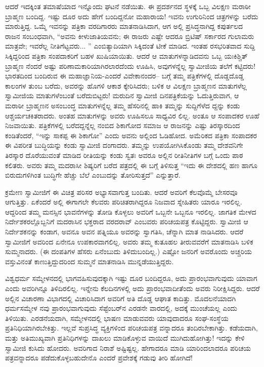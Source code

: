 ಆದರೆ ಇದಕ್ಕಿಂತ ತಮಾಷೆಯಾದ ಇನ್ನೊಂದು ಘಟನೆ ನಡೆಯಿತು. ಈ ಪ್ರದರ್ಶನದ ಸ್ಥಳಕ್ಕೆ ಒಬ್ಬ ವಿಲಕ್ಷಣ ಮರಾಠೀ ಬ್ರಾಹ್ಮಣ ಬಂದಿದ್ದ. ಇಷ್ಟು ದೂರ ಅದು ಹೇಗೆ ಬಂದಿದ್ದನೋ ಮಹಾರಾಯ! ಇವನು ಉಗುರಿನಿಂದ ಚಿತ್ರಗಳನ್ನು ಬರೆದು ಮಾರುತ್ತಿದ್ದ. ಒಮ್ಮೆ ಇವನನ್ನು ಪತ್ರಿಕಾ ವರದಿಗಾರರು ಮಾತನಾಡಿಸಿದಾಗ, ಆಗ ಅಲ್ಲಿ ಪ್ರಸಿದ್ಧನಾಗಿದ್ದ ಕಪುರ್ತಲದ ರಾಜನ ಸಂಬಂಧವಾಗಿ, “ಅವನು ಕೀಳುಜಾತಿಯವನು; ಈ ರಾಜರು ಎಷ್ಟೇ ಆದರೂ ಬ್ರಿಟಿಷ್ ಸರ್ಕಾರದ ಗುಲಾಮರು ಮಾತ್ರವೇ; ಇವರೆಲ್ಲ ನೀತಿಗೆಟ್ಟವರು... ” ಎಂಬಿತ್ಯಾದಿಯಾಗಿ ಸಿಕ್ಕಿದಂತೆ ಟೀಕೆ ಮಾಡಿದ. ಇಂತಹ ರಸಭರಿತವಾದ ಸುದ್ದಿ ಸಿಕ್ಕಿದ್ದರಿಂದ ಪತ್ರಿಕಾ ಸಂಪದಾಕರಿಗೆ ಬಹಳ ಖುಷಿಯಾಯಿತು. ಆದರೆ ಆ ಮಾತುಗಳನ್ನಾಡಿದವನು ಒಬ್ಬ ಯಃಕಿಶ್ಚಿತ್ ಬ್ರಾಹ್ಮಣ ನೆಂದರೆ ಅಷ್ಟು ಪರಿಣಾಮಕಾರಿಯಾಗಿರಲಾರದೆಂದು ಊಹಿಸಿ, ಅವುಗಳನ್ನೆಲ್ಲ ಸ್ವಾಮೀಜಿಯ ತಲೆಗೆ ಕಟ್ಟಿದರು! ಭಾರತದಿಂದ ಬಂದಿರುವ ಈ ಮಹಾಜ್ಞಾನಿಯ-ಎಂದರೆ ವಿವೇಕಾನಂದರ– ಬಗ್ಗೆ ತಮ್ಮ ಪತ್ರಿಕೆಗಳಲ್ಲಿ ದೊಡ್ಡದೊಡ್ಡ ಕಾಲಂಗಳ ತುಂಬ ಬರೆದು, ಅವರನ್ನು ಹೊಗಳಿ ಆಕಾಶ ಕ್ಕೇರಿಸಿದರು; ಬಳಿಕ ಆ ವಿಲಕ್ಷಣ ಬ್ರಾಹ್ಮಣನ ಮಾತುಗಳೆಲ್ಲ ಸ್ವಾಮೀಜಿಯ ಮಾತುಗಳೆಂಬಂತೆ ಬರೆದುಬಿಟ್ಟರು! ಮರುದಿನ ಸ್ವಾಮೀಜಿ ದಿನಪತ್ರಿಕೆಯನ್ನು ಓದುತ್ತಿರುವಾಗ, ಆ ಮರಾಠೀ ಬ್ರಾಹ್ಮಣನ ಅಸಂಬಂದ್ಧ ಮಾತುಗಳನ್ನೆಲ್ಲ ತಮ್ಮ ಹೆಸರಿನಲ್ಲಿ ಹಾಕಿ ತಮ್ಮನ್ನು ಸುದ್ದಿಗೆಳೆದ ದ್ದನ್ನು ಕಂಡು ಆಶ್ಚರ್ಯಚಕಿತರಾದರು. ಅಂತಹ ಮಾತುಗಳನ್ನು ಅವರು ಊಹಿಸಲೂ ಸಾಧ್ಯವಿರ ಲಿಲ್ಲ. ಅಂತೂ ಆ ಸಂಪಾದಕರ ಊಹೆ ನಿಜವಾಯಿತು. ಪತ್ರಿಕೆಗಳಲ್ಲಿ ಬರೆದದ್ದನ್ನೆಲ್ಲ ನಂಬಿದ ಶಿಕಾಗೋದ ಸಮಾಜ ಆ ರಾಜನನ್ನು ಎಷ್ಟು ತಿರಸ್ಕಾರದಿಂದ ಕಂಡಿತೆಂದರೆ, “ಇನ್ನು ಸಾಕಪ್ಪ ಈ ಶಿಕಾಗೋ” ಎಂದು ಅವನು ಅಲ್ಲಿಂದ ಓಡಿಹೋದ. ಅಮೆರಿಕದ ಪತ್ರಿಕಾ ಸಂಪಾದಕರ ಈ ವಿಪರೀತ ಬುದ್ಧಿಯನ್ನು ಕಂಡು ಸ್ವಾಮೀಜಿ ದಂಗಾದರು. ತಮ್ಮನ್ನು ಉಪಯೋಗಿಸಿಕೊಂಡು ತಮ್ಮ ದೇಶವನಿಗೇ ತಿರಸ್ಕಾರ ದೊರೆಯುವಂತೆ ಮಾಡಿದ ರೀತಿಯನ್ನು ಕಂಡು ಸ್ವತಃ ಅವರೂ ಅಲ್ಲಿನ ರೀತಿನೀತಿಗಳ ಬಗ್ಗೆ ಒಂದು ಪಾಠ ಕಲಿತರು. ಅವರು ತಮ್ಮ ಮದರಾಸೀ ಶಿಷ್ಯರಿಗೆ ಬರೆದ ಪತ್ರದಲ್ಲಿ ಈ ಬಗ್ಗೆ ತಿಳಿಸುತ್ತ “ಇದು ಈ ದೇಶದಲ್ಲಿ ಹಣ ಹಾಗೂ ಬಿರುದುಗಳಿಗಿಂತ ಬುದ್ಧಿಗೇ ಹೆಚ್ಚು ಬೆಲೆ ಎಂಬುದನ್ನು ತೋರಿಸುತ್ತದೆ” ಎನ್ನುತ್ತಾರೆ.

ಕ್ರಮೇಣ ಸ್ವಾಮೀಜಿಗೆ ಈ ವಿಚಿತ್ರ ಪರಿಸರ ಅಭ್ಯಾಸವಾಗುತ್ತ ಬಂದಿತು. ಆದರೆ ಅವರಿಗೆ ಕೆಲವೊಮ್ಮೆ ಬೇಸರವೂ ಆಗುತ್ತಿತ್ತು. ಏಕೆಂದರೆ ಅಲ್ಲಿ ಈಗಾಗಲೇ ಕೆಲವರು ಪರಿಚಿತರಾಗಿದ್ದರೂ ನಿಜವಾದ ಸ್ನೇಹಿತರು ಯಾರೂ ಇರಲಿಲ್ಲ. ಆದ್ದರಿಂದ ತಮ್ಮ ಮನಸ್ಸಿನ ಭಾವನೆಗಳನ್ನು ತೋಡಿ ಕೊಳ್ಳಲು ಅವರಿಗೆ ಒಬ್ಬನೇ ಒಬ್ಬನೂ ಇರಲಿಲ್ಲ. ಜಾಗತಿಕ ಮೇಳದ ನಿರ್ದೇಶಕರಲ್ಲೊಬ್ಬನಿಗೆ ಮದರಾಸಿನ ಭಕ್ತರಾದ ವರದರಾವ್ ಎಂಬವರು ಪರಿಚಯಪತ್ರ ಕೊಟ್ಟಿದ್ದರು. ಸ್ವಾಮೀಜಿ ಆ ನಿರ್ದೇಶಕನನ್ನು ಕಂಡಾಗ, ಅವನೂ ಅವನ ಪತ್ನಿಯೂ ಅವರನ್ನು ಸ್ವಾಗತಿಸಿ, ಚೆನ್ನಾಗಿ ಮಾತ ನಾಡಿಸಿದರು. ಆದರೆ ಸ್ವಾಮೀಜಿಗೆ ಅವರಿಂದ ಏನೇನೂ ಉಪಕಾರವಾಗಲಿಲ್ಲ. ಅವರು ತಮ್ಮ ಕುತೂಹಲ ತೀರುವವರೆಗೆ ಮಾತನಾಡಿಸಿ ಬಳಿಕ ಸುಮ್ಮನಾದರು. (ಈ ದಂಪತಿಗಳ ಹೆಸರು ಏನೆಂಬುದು ತಿಳಿದುಬಂದಿಲ್ಲ.) ಎಷ್ಟೋ ಜನರಿಗೆ ಅವರೊಂದು ಅಚ್ಚರಿಯ ವಸ್ತುವಿನಂತೆ ಕಾಣುತ್ತಿದ್ದುದರಿಂದ ಸುಮ್ಮನೆ ಮಾತನಾಡಿಸಿ ಮುನ್ನಡೆಯುತ್ತಿದ್ದರು.

ವಿಶ್ವಧರ್ಮ ಸಮ್ಮೇಳನದಲ್ಲಿ ಭಾಗವಹಿಸುವುದಕ್ಕಾಗಿ ಇಷ್ಟು ದೂರ ಬಂದಿದ್ದರೂ, ಅದು ಪ್ರಾರಂಭವಾಗುವುದು ಯಾವಾಗ ಎಂದು ಅವರಿಗಿನ್ನೂ ತಿಳಿದಿರಲಿಲ್ಲ. ಇನ್ನೇನು ಕೆಲದಿನಗಳಲ್ಲಿ ಅದು ಪ್ರಾರಂಭವಾದೀತೆಂದು ಅವರು ನಿರೀಕ್ಷಿಸಿದ್ದರು. ಆದರೆ ಅಲ್ಲಿನ ವಿಚಾರಣಾ ವಿಭಾಗದಲ್ಲಿ ವಿಚಾರಿಸಿದಾಗ ಅವರಿಗೆ ಅತಿ ದೊಡ್ಡ ಆಘಾತ ಕಾದಿತ್ತು. ಮೊದಲನೆಯಾದಗಿ ಧರ್ಮಸಮ್ಮೇಳ ನವು ಪ್ರಾರಂಭವಾಗುವುದು ಸೆಪ್ಟೆಂಬರ್​ನ ಎರಡನೇ ವಾರದಲ್ಲಿ, ಅದಕ್ಕೆ ಮುಂಚೆಯಲ್ಲ ಎಂದು ತಿಳಿಯಿತು. ಎರಡನೆಯದಾಗಿ, ಸಮ್ಮೇಳನದಲ್ಲಿ ಭಾಷಣ ಮಾಡುವವರು ಯಾವುದಾದರೂ ಸಂಘ-ಸಂಸ್ಥೆಯ ಪ್ರತಿನಿಧಿಯಾಗಿರಬೇಕಿತ್ತು. ಇಲ್ಲವೆ ಸುಪ್ರಸಿದ್ಧ ವ್ಯಕ್ತಿಗಳಿಂದ ಪರಿಚಯಪತ್ರ ವನ್ನಾದರೂ ತಂದಿರಬೇಕಾಗಿತ್ತು. ಕಡೆಯದಾಗಿ, ಮತ್ತು ಅತಿಮುಖ್ಯವಾಗಿ ಪ್ರತಿನಿಧಿಗಳನ್ನು ದಾಖಲು ಮಾಡಿಕೊಳ್ಳುವ ವಾಯಿದೆ ಮುಗಿದುಹೋಗಿತ್ತು! ಇದನ್ನು ಕೇಳಿ ಸ್ವಾಮೀಜಿ ಕುಸಿದು ಹೋದರು. ಅವರಿಗಾದ ನಿರಾಶೆ ಅಷ್ಟಿಷ್ಟಲ್ಲ. ಹೇಗಾದರೂ ಮಾಡಿ ಯಾರಿಂದಲಾದರೂ ಪರಿಚಯ ಪತ್ರವನ್ನಾದರೂ ಪಡೆದುಕೊಳ್ಳಬಹುದೇನೊ ಎಂದರೆ ಪ್ರವೇಶಕ್ಕೆ ಗಡುವು ತೀರಿ ಹೋಗಿದೆ!

